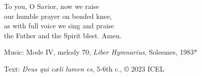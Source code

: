 \hymn



\begin{underhymnverse}
To you, O Savior, now we raise\\
our humble prayer on bended knee,\\
as with full voice we sing and praise\\
the Father and the Spirit blest. Amen.
\end{underhymnverse}

\begin{hymnsource}
Music: Mode IV, melody 70; \emph{Liber Hymnarius}, Solesmes, 1983*

Text: \emph{Deus qui cæli lumen es}, 5-6th c., © 2023 ICEL
\end{hymnsource}
